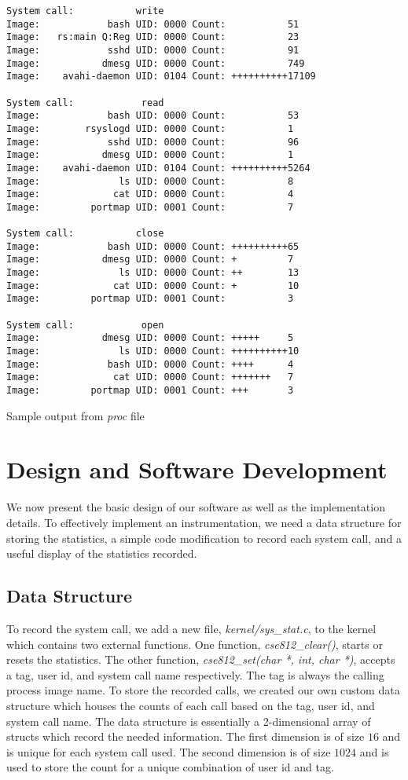 \documentclass[conference]{IEEEtran}
\begin{document}
\begin{algorithm*}[t!]
\begin{verbatim}
System call:           write
Image:            bash UID: 0000 Count:           51
Image:   rs:main Q:Reg UID: 0000 Count:           23
Image:            sshd UID: 0000 Count:           91
Image:           dmesg UID: 0000 Count:           749
Image:    avahi-daemon UID: 0104 Count: ++++++++++17109

System call:            read
Image:            bash UID: 0000 Count:           53
Image:        rsyslogd UID: 0000 Count:           1
Image:            sshd UID: 0000 Count:           96
Image:           dmesg UID: 0000 Count:           1
Image:    avahi-daemon UID: 0104 Count: ++++++++++5264
Image:              ls UID: 0000 Count:           8
Image:             cat UID: 0000 Count:           4
Image:         portmap UID: 0001 Count:           7

System call:           close
Image:            bash UID: 0000 Count: ++++++++++65
Image:           dmesg UID: 0000 Count: +         7
Image:              ls UID: 0000 Count: ++        13
Image:             cat UID: 0000 Count: +         10
Image:         portmap UID: 0001 Count:           3

System call:            open
Image:           dmesg UID: 0000 Count: +++++     5
Image:              ls UID: 0000 Count: ++++++++++10
Image:            bash UID: 0000 Count: ++++      4
Image:             cat UID: 0000 Count: +++++++   7
Image:         portmap UID: 0001 Count: +++       3
\end{verbatim}
\caption{Sample output from \textit{proc} file}
\end{algorithm*}


\section{Design and Software Development}
\label{sec:design}
We now present the basic design of our software as well as the implementation details.
To effectively implement an instrumentation, we need a data structure for storing the statistics, a simple code modification to record each system call, and a useful display of the statistics recorded.

\subsection{Data Structure}
To record the system call, we add a new file, \textit{kernel/sys\_stat.c}, to the kernel which contains two external functions.
One function, \textit{cse812\_clear()}, starts or resets the statistics.
The other function, \textit{cse812\_set(char *, int, char *)}, accepts a tag, user id, and system call name respectively.
The tag is always the calling process image name.
To store the recorded calls, we created our own custom data structure which houses the counts of each call based on the tag, user id, and system call name.
The data structure is essentially a 2-dimensional array of structs which record the needed information.
The first dimension is of size $16$ and is unique for each system call used.
The second dimension is of size $1024$ and is used to store the count for a unique combination of user id and tag.
\end{document}
